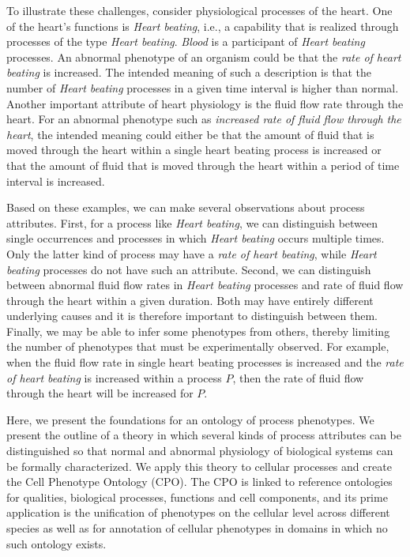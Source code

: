 \documentclass{bioinfo}
\begin{document}
To illustrate these challenges, consider physiological processes of
the heart. One of the heart's functions is {\em Heart beating}, i.e.,
a capability that is realized through processes of the type {\em Heart
  beating}. {\em Blood} is a participant of {\em Heart beating}
processes.  An abnormal phenotype of an organism could be that the
{\em rate of heart beating} is increased. The intended meaning of such
a description is that the number of {\em Heart beating} processes in a
given time interval is higher than normal. Another important attribute
of heart physiology is the fluid flow rate through the heart. For an
abnormal phenotype such as {\em increased rate of fluid flow through
  the heart}, the intended meaning could either be that the amount of
fluid that is moved through the heart within a single heart beating
process is increased or that the amount of fluid that is moved through
the heart within a period of time interval is increased. 

Based on these examples, we can make several observations about
process attributes. First, for a process like {\em Heart beating}, we
can distinguish between single occurrences and processes in which {\em
  Heart beating} occurs multiple times. Only the latter kind of
process may have a {\em rate of heart beating}, while {\em Heart
  beating} processes do not have such an attribute. Second, we can
distinguish between abnormal fluid flow rates in {\em Heart beating}
processes and rate of fluid flow through the heart within a given
duration. Both may have entirely different underlying causes and it is
therefore important to distinguish between them. Finally, we may be
able to infer some phenotypes from others, thereby limiting the number
of phenotypes that must be experimentally observed. For example, when
the fluid flow rate in single heart beating processes is increased and
the {\em rate of heart beating} is increased within a process $P$,
then the rate of fluid flow through the heart will be increased for
$P$.

Here, we present the foundations for an ontology of process
phenotypes. We present the outline of a theory in which several kinds
of process attributes can be distinguished so that normal and abnormal
physiology of biological systems can be formally characterized. We
apply this theory to cellular processes and create the Cell Phenotype
Ontology (CPO). The CPO is linked to reference ontologies for
qualities, biological processes, functions and cell components, and
its prime application is the unification of phenotypes on the cellular
level across different species as well as for annotation of cellular
phenotypes in domains in which no such ontology exists.
\end{document}
